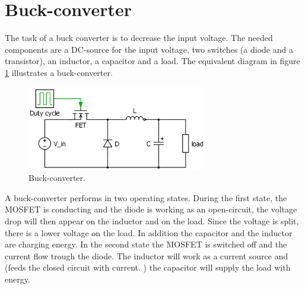 \section{Buck-converter\label{Buck-C}}

The task of a buck converter is to decrease the input voltage. The needed components are a DC-source for the input voltage, two switches (a diode and a transistor), an inductor, a capacitor and a load. The equivalent diagram in figure \ref{Buck-converter} illustrates a buck-converter. 

\begin{figure}[htbp]
	\begin{center}
		\includegraphics[width=0.7\textwidth]{../Pictures/Buck-converter}
		\caption{Buck-converter.}
		\label{Buck-converter}
	\end{center}	
\end{figure}

A buck-converter performs in two operating states. 
During the first state, the MOSFET is conducting and the diode is working as an open-circuit, the voltage drop will then appear on the inductor and on the load. Since the voltage is split, there is a lower voltage on the load. In addition the capacitor and the inductor are charging energy. In the second state the MOSFET is switched off and the current flow trough the diode. The inductor will work as a current source and (feeds the closed circuit with current. ) the capacitor will supply the load with energy.

